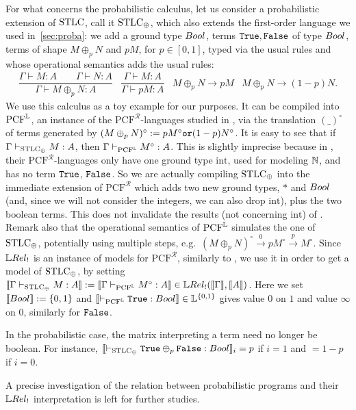 For what concerns the probabilistic calculus, let us consider a probabilistic extension of $\mathrm{STLC}$, call it $\mathrm{STLC}_\oplus$, which also extends the first-order language we used in~\autoref{sec:proba}:
we add a ground type $\bool$, terms $\mathtt{True},\mathtt{False}$ of type $\bool$, terms of shape $M\oplus_p N$ and $pM$, for $p\in[0,1]$, typed via the usual rules and whose operational semantics adds the usual rules:
{\small{\[\begin{array}{cccc}
           \dfrac{\Gamma\vdash M:A \qquad \Gamma\vdash N:A}{\Gamma\vdash M\oplus_p N:A}
           &
           \dfrac{\Gamma\vdash M:A}{\Gamma\vdash pM:A}
           &
           M\oplus_p N \to pM
           &
           M\oplus_p N \to (1-p)N.
          \end{array}\]}}
We use this calculus as a toy example for our purposes.
It can be compiled into $\mathrm{PCF}^{\mathbb{L}}$, an instance of the $\mathrm{PCF}^{\mathcal R}$-languages studied in \cite{Manzo2013}, via the translation $(\_)^\circ$ of terms generated by $(M\oplus_p N)^\circ:=pM^\circ\mathtt{ or } (1-p)N^\circ$.
It is easy to see that if $\Gamma \vdash_{\mathrm{STLC}_\oplus} M:A$, then $\Gamma \vdash_{\mathrm{PCF}^{\mathbb{L}}} M^\circ:A$.
This is slightly imprecise because in \cite{Manzo2013}, their $\mathrm{PCF}^{\mathcal R}$-languages only have one ground type $\mathrm{int}$, used for modeling $\mathbb{N}$, and has no term $\mathtt{True}$, $\mathtt{False}$.
So we are actually compiling $\mathrm{STLC}_\oplus$ into the immediate extension of $\mathrm{PCF}^{\mathcal R}$ which adds two new ground types, $*$ and $\bool$ (and, since we will not consider the integers, we can also drop $\mathrm{int}$), plus the two boolean terms.
This does not invalidate the results (not concerning $\mathrm{int}$) of \cite{Manzo2013}.
Remark also that the operational semantics of $\mathrm{PCF}^{\mathbb{L}}$ \cite[Fig.\ 1]{Manzo2013} simulates the one of $\mathrm{STLC}_\oplus$, potentially using multiple steps, e.g.\ $(M\oplus_p N)^\circ \overset{0}{\rightarrow} pM^\circ \overset{p}{\rightarrow} M^\circ$.
Since $\LREL_!$ is an instance of models for $\mathrm{PCF}^{\mathcal{R}}$, similarly to \cite[Section VI]{Manzo2013}, we use it in order to get a model of $\mathrm{STLC}_\oplus$, by setting $\model{\Gamma \vdash_{\STLC_\oplus} M:A}:=\model{\Gamma \vdash_{\mathrm{PCF}^{\Lawv}} M^\circ:A}\in\HOM{\LREL_!}{\model{\Gamma}}{\model{A}}$.
Here we set $\model{\bool}:=\{0,1\}$ and $\model{\vdash_{\mathrm{PCF}^{\Lawv}} \true:\bool}\in\Lawv^{\{0,1\}}$ gives value $0$ on $1$ and value $\infty$ on $0$, similarly for $\mathtt{False}$.

\begin{remark}
 In the probabilistic case, the matrix interpreting a term need no longer be boolean.
 For instance, $\model{\vdash_{\STLC_\oplus} \true\oplus_p\false :\bool}_i=p$ if $i=1$ and $=1-p$ if $i=0$.
\end{remark}

A precise investigation of the relation between probabilistic programs and their $\LREL_!$ interpretation is left for further studies.

